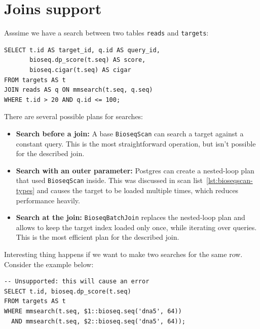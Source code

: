 \section{Joins support}
\label{sec:mmsearch-join-ownership}

Asssime we have a search between two tables \texttt{reads} and \texttt{targets}:

\noindent\begin{minipage}{\linewidth}
\begin{lstlisting}[style=bioseq-search-sql,caption={Search sequence pairs from two tables.}]
SELECT t.id AS target_id, q.id AS query_id,
       bioseq.dp_score(t.seq) AS score,
       bioseq.cigar(t.seq) AS cigar
FROM targets AS t
JOIN reads AS q ON mmsearch(t.seq, q.seq)
WHERE t.id > 20 AND q.id <= 100;
\end{lstlisting}
\end{minipage}

There are several possible plans for searches:

\begin{itemize}
  \item \textbf{Search before a join:} A base \texttt{BioseqScan} can search
    a target against a constant query. This is the most straightforward operation, but isn't possible for the described join.
  \item \textbf{Search with an outer parameter:} Postgres can create a nested-loop plan that used \texttt{BioseqScan} inside. This was discussed in scan list~\ref{lst:bioseqscan-types} and causes the target to be loaded multiple times, which reduces performance heavily.
  \item \textbf{Search at the join:} \texttt{BioseqBatchJoin} replaces the nested-loop plan and allows to keep the target index loaded only once, while iterating over queries. This is the most efficient plan for the described join.
\end{itemize}

Interesting thing happens if we want to make two searches for the same row. Consider the example below:

\begin{minipage}{\linewidth}
\begin{lstlisting}[style=bioseq-search-sql,caption={Two searches with one ambiguous target binding.},label={lst:ambiguous-target-binding}]
-- Unsupported: this will cause an error
SELECT t.id, bioseq.dp_score(t.seq)
FROM targets AS t
WHERE mmsearch(t.seq, $1::bioseq.seq('dna5', 64))
  AND mmsearch(t.seq, $2::bioseq.seq('dna5', 64));
\end{lstlisting}
\end{minipage}

